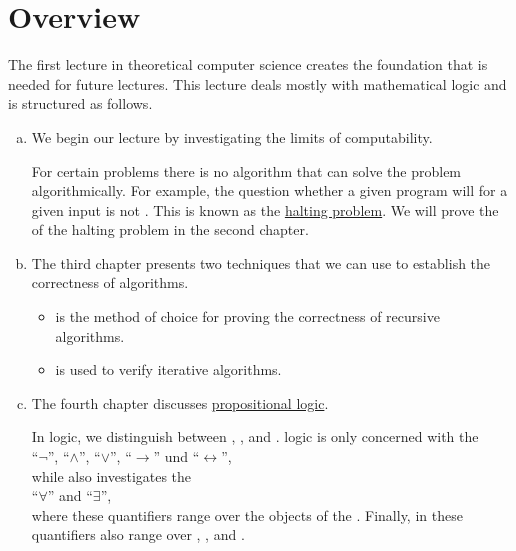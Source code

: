 \section{Overview} 
The first lecture in theoretical computer science creates the foundation that is needed for future lectures.
This lecture deals mostly with mathematical logic and is structured as follows.
\begin{enumerate}[(a)]
\item We begin our lecture by investigating the limits of computability.

      For certain problems there is no algorithm that can solve the problem algorithmically. 
      For example, the question whether a given program will  for a given input is not
      .  This is known as the \href{https://en.wikipedia.org/wiki/Halting_problem}{halting problem}.  
      We will prove the  of the halting problem in the second chapter. 
\item The third chapter presents two techniques that we can use to establish the correctness of algorithms.
      \begin{itemize}
      \item {} is the method of choice for proving the correctness of recursive
            algorithms.
      \item {} is used to verify iterative algorithms.
      \end{itemize}      
\item The fourth chapter discusses \href{https://en.wikipedia.org/wiki/Propositional_calculus}{propositional logic}.

      In logic, we distinguish between  ,
      , and .   logic is only
      concerned with the 
      \\[0.2cm]
      \hspace*{1.3cm}
      ``$\neg$'', ``$\wedge$'', ``$\vee$'', ``$\rightarrow$'' und ``$\leftrightarrow$'',
      \\[0.2cm]
      while  also investigates the 
      \\[0.2cm]
      \hspace*{1.3cm}
      ``$\forall$'' and ``$\exists$'',
      \\[0.2cm]
      where these quantifiers range over the objects of the .
      Finally, in  these quantifiers also range over , , and
      . 


\end{enumerate}
